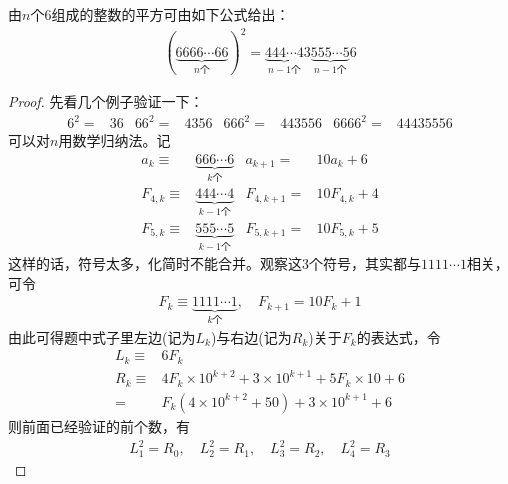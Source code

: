 \begin{example}[6组成的数字的平方]
  由$n$个6组成的整数的平方可由如下公式给出：
  \begin{align*}
    \left( \underbrace{6666\cdots 66}_{n\text{个}} \right)^2 =
    \underbrace{444\cdots 4}_{n-1\text{个}}3\underbrace{555\cdots 5}_{n-1\text{个}}6
  \end{align*}
\end{example}
\begin{proof}
  先看几个例子验证一下：
  \begin{align*}
    6^2 ={}& 36 & 66^2 ={}& 4356 & 666^2={}& 443556 & 6666^2={}& 44435556
  \end{align*}
  可以对$n$用数学归纳法。记
  \begin{align*}
    a_k \equiv{}& \underbrace{666\cdots 6}_{k\text{个}}      & a_{k+1}   ={}& 10a_k + 6\\
    F_{4,k} \equiv{}& \underbrace{444\cdots 4}_{k-1\text{个}} & F_{4,k+1} ={}& 10F_{4,k} + 4 \\
    F_{5,k} \equiv{}& \underbrace{555\cdots 5}_{k-1\text{个}} & F_{5,k+1} ={}& 10F_{5,k} + 5
  \end{align*}
  这样的话，符号太多，化简时不能合并。观察这3个符号，其实都与$1111\cdots1$相关，可令
  \begin{align*}
    F_k \equiv \underbrace{1111\cdots1}_{k\text{个}}, \quad F_{k+1} = 10F_k + 1
  \end{align*}
  由此可得题中式子里左边(记为$L_k$)与右边(记为$R_k$)关于$F_k$的表达式，令
  \begin{align*}
    L_k \equiv{}& 6F_k\\
    R_k \equiv{}& 4F_k\times10^{k+2} + 3\times10^{k+1} + 5F_k\times10 + 6\\
             ={}& F_k\left(4\times10^{k+2} + 50\right) + 3\times 10^{k+1} + 6
  \end{align*}
  则前面已经验证的前个数，有
  \begin{align*}
    L_1^2 = R_0, \quad L_2^2 = R_1, \quad L_3^2 = R_2, \quad L_4^2 = R_3
  \end{align*}


\end{proof}
